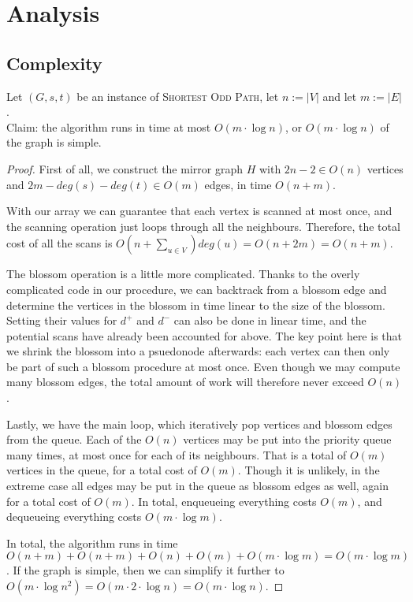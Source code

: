\section{Analysis}

\subsection{Complexity}
Let $(G,s,t)$ be an instance of \textsc{Shortest Odd Path}, let $n := |V|$ and let $m := |E|$. \\
Claim: the algorithm runs in time at most $O(m \cdot \log n)$, or $O(m \cdot \log n)$ of the graph is simple.
\begin{proof}  
    First of all, we construct the mirror graph $H$ with $2n-2 \in O(n)$ vertices and $2m - deg(s) - deg(t) \in O(m)$ edges, in time $O(n+m)$.
    
    With our  array we can guarantee that each vertex is scanned at most once, and the scanning operation just loops through all the neighbours. Therefore, the total cost of all the scans is $O(n + \sum_{u \in V}) deg(u) = O(n + 2m) = O(n + m)$.

    The blossom operation is a little more complicated. Thanks to the overly complicated code in our  procedure, we can backtrack from a blossom edge and determine the vertices in the blossom in time linear to the size of the blossom. Setting their values for $d^+$ and $d^-$ can also be done in linear time, and the potential scans have already been accounted for above. The key point here is that we shrink the blossom into a psuedonode afterwards: each vertex can then only be part of such a blossom procedure at most once. Even though we may compute many blossom edges, the total amount of work will therefore never exceed $O(n)$.

    Lastly, we have the main loop, which iteratively pop vertices and blossom edges from the queue. Each of the $O(n)$ vertices may be put into the priority queue many times, at most once for each of its neighbours. That is a total of $O(m)$ vertices in the queue, for a total cost of $O(m)$. Though it is unlikely, in the extreme case all edges may be put in the queue as blossom edges as well, again for a total cost of $O(m)$. In total, enqueueing everything costs $O(m)$, and dequeueing everything costs $O(m \cdot \log m)$.

    In total, the algorithm runs in time $O(n+m) + O(n+m) + O(n) + O(m) + O(m \cdot \log m) = O(m \cdot \log m)$.
    If the graph is simple, then we can simplify it further to $O(m \cdot \log n^2) = O(m \cdot 2 \cdot \log n) = O(m \cdot \log n)$.
\end{proof}

